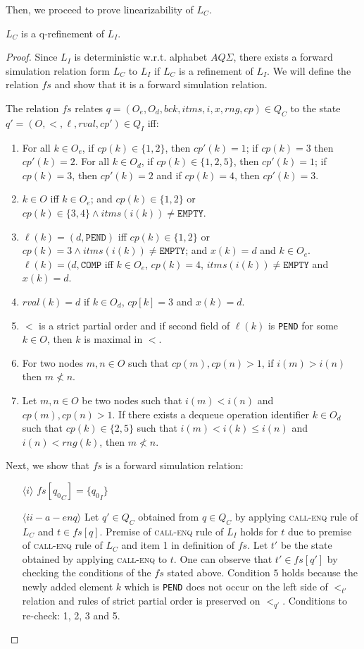Then, we proceed to prove linearizability of $L_C$.
\begin{lem}
$L_C$ is a q-refinement of $L_I$.
\end{lem}
\begin{proof}
Since $L_I$ is deterministic w.r.t. alphabet $AQ\Sigma$, there exists a forward simulation relation form $L_C$ to $L_I$ if $L_C$ is a refinement of $L_I$. We will define the relation $fs$ and show that it is a forward simulation relation.

The relation $fs$ relates $q = (O_e, O_d, bck, itms, i,x, rng, cp) \in Q_C$ to the state $q'=(O,<,\ell,rval,cp') \in Q_I$ iff:
\begin{enumerate}
\item For all $k \in O_e$, if $cp(k) \in \{1,2\}$, then $cp'(k) = 1$; if $cp(k) = 3$ then $cp'(k)=2$. For all $k \in O_d$, if $cp(k) \in \{1,2,5\}$, then $cp'(k) = 1$; if $cp(k) = 3$, then $cp'(k)=2$ and if $cp(k)=4$, then $cp'(k)=3$. 
\item $k \in O$ iff $k \in O_e$; and $cp(k) \in \{1,2\}$ or $cp(k) \in \{3,4\} \wedge itms(i(k)) \neq \texttt{EMPTY}$.
\item $\ell(k)= (d, \texttt{PEND})$ iff $cp(k) \in \{1,2\}$ or $cp(k) =3 \wedge itms(i(k)) \neq \texttt{EMPTY}$; and $x(k) = d$ and $k \in O_e$. $\ell(k) = (d,\texttt{COMP}$ iff $k \in O_e$, $cp(k) = 4$, $itms(i(k)) \neq \texttt{EMPTY}$ and $x(k)=d$. 
\item $rval(k)=d$ if $k \in O_d$, $cp[k] = 3$ and $x(k) = d$.
\item $<$ is a strict partial order and if second field of $\ell(k)$ is \texttt{PEND} for some $k \in O$, then $k$ is maximal in $<$.
\item For two nodes $m,n \in O$ such that $cp(m), cp(n) > 1$, if $i(m) > i(n)$ then $m \nless n$.
\item Let $m,n \in O$ be two nodes such that $i(m) < i(n)$ and $cp(m), cp(n) > 1$. If there exists a dequeue operation identifier $k \in O_d$ such that $cp(k) \in \{2,5 \}$ such that $i(m) < i(k) \leq i(n)$ and $i(n) < rng(k)$, then $m \nless n$.
\end{enumerate}
Next, we show that $fs$ is a forward simulation relation:
\begin{itemize}
\item[$\langle i \rangle$] $fs[{q_0}_C] = \{ {q_0}_I \}$
\item[$\langle ii-a-enq \rangle$] Let $q' \in Q_C$ obtained from $q \in Q_C$ by applying \textsc{call-enq} rule of $L_C$ and $t \in fs[q]$. Premise of \textsc{call-enq} rule of $L_I$ holds for $t$ due to premise of \textsc{call-enq} rule of $L_C$ and item 1 in definition of $fs$. Let $t'$ be the state obtained by applying \textsc{call-enq} to $t$. One can observe that $t' \in fs[q']$ by checking the conditions of the $fs$ stated above. Condition $5$ holds because the newly added element $k$ which is \texttt{PEND}  does not occur on the left side of $<_{t'}$ relation and rules of strict partial order is preserved on $<_{q'}$. Conditions to re-check: 1, 2, 3 and 5. 

\end{itemize}
\end{proof}
